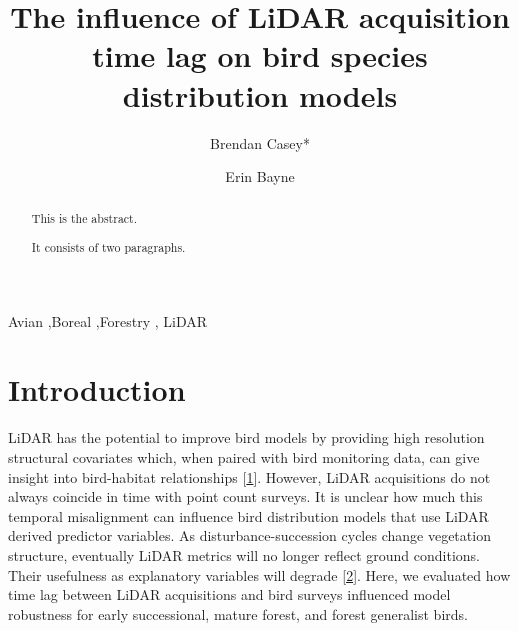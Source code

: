 \documentclass[manuscript, 3p, authoryear]{elsarticle} %
\begin{document}
\begin{frontmatter}

  \title{The influence of LiDAR acquisition time lag on bird species distribution models}
    \author[University of Alberta]{Brendan Casey*%
  }
    \author[University of Alberta]{Erin Bayne}
  
  \begin{abstract}
  This is the abstract.

  It consists of two paragraphs.
  \end{abstract}
    \begin{keyword}
    Avian \sep Boreal \sep Forestry \sep 
    LiDAR
  \end{keyword}
  
 \end{frontmatter}

\hypertarget{introduction}{%
\section{Introduction}\label{introduction}}

LiDAR has the potential to improve bird models by providing high resolution structural covariates which, when paired with bird monitoring data, can give insight into bird-habitat relationships {[}\protect\hyperlink{ref-Bradbury2005}{1}{]}. However, LiDAR acquisitions do not always coincide in time with point count surveys. It is unclear how much this temporal misalignment can influence bird distribution models that use LiDAR derived predictor variables. As disturbance-succession cycles change vegetation structure, eventually LiDAR metrics will no longer reflect ground conditions. Their usefulness as explanatory variables will degrade {[}\protect\hyperlink{ref-VierlingSwift2014}{2}{]}. Here, we evaluated how time lag between LiDAR acquisitions and bird surveys influenced model robustness for early successional, mature forest, and forest generalist birds.
\end{document}
